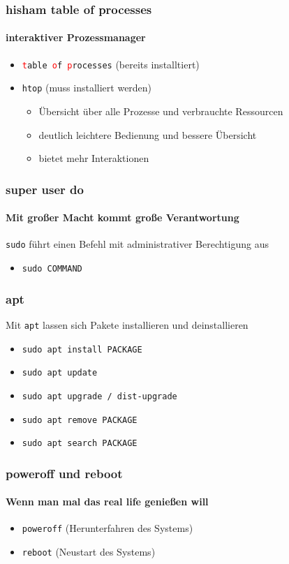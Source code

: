 \documentclass[12pt,utf8]{beamer}
\begin{document}
\begin{frame}
\frametitle{\textcolor{FOSSAGalert}{h}isham \textcolor{FOSSAGalert}{t}able \textcolor{FOSSAGalert}{o}f \textcolor{FOSSAGalert}{p}rocesses}
\framesubtitle{interaktiver Prozessmanager}
\begin{itemize}
	\item \texttt{\textcolor{red}{t}able \textcolor{red}{o}f \textcolor{red}{p}rocesses} (bereits installtiert)
	\item \texttt{htop} (muss installiert werden)
	\begin{itemize}[<+->]
		\item {\scriptsize Übersicht über alle Prozesse und verbrauchte Ressourcen}
		\item {\scriptsize deutlich leichtere Bedienung und bessere Übersicht}
		\item {\scriptsize bietet mehr Interaktionen}
	\end{itemize}
\end{itemize}
\end{frame}

\begin{frame}
	\frametitle{\textcolor{FOSSAGalert}{s}uper \textcolor{FOSSAGalert}{u}ser \textcolor{FOSSAGalert}{do}}
	\framesubtitle{Mit großer Macht kommt große Verantwortung}
	\texttt{sudo} führt einen Befehl mit administrativer Berechtigung aus
	\begin{itemize}
		\item \texttt{sudo COMMAND}
	\end{itemize}
\end{frame}

\begin{frame}
	\frametitle{apt}
	Mit \texttt{apt} lassen sich Pakete installieren und deinstallieren
	\begin{itemize}
		\item \texttt{sudo apt install PACKAGE}
		\item \texttt{sudo apt update}
		\item \texttt{sudo apt upgrade / dist-upgrade}
		\item \texttt{sudo apt remove PACKAGE}
		\item \texttt{sudo apt search PACKAGE}
	\end{itemize}
\end{frame}

\begin{frame}
\frametitle{poweroff und reboot}
\framesubtitle{Wenn man mal das real life genießen will}
\begin{itemize}
	\item \texttt{poweroff} (Herunterfahren des Systems)
	\item \texttt{reboot} (Neustart des Systems)
\end{itemize}
\end{frame}
\end{document}
